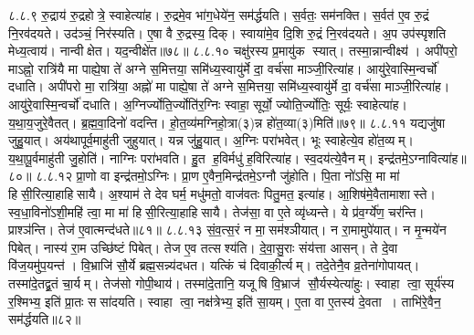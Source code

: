 ८.८.९
रु॒द्राय॑ रु॒द्रहोत्रे॒ स्वाहेत्या॑ह। रु॒द्रमे॒व भा॑ग॒धेये॑न॒ सम॑र्द्धयति। स॒र्वतः॒ सम॑नक्ति। स॒र्वत॑ ए॒व रु॒द्रं नि॒रव॑दयते। उद॑ञ्चं॒ निर॑स्यति। ए॒षा वै रु॒द्रस्य॒ दिक्। स्वाया॑मे॒व दि॒शि रु॒द्रं नि॒रव॑दयते। अ॒प उप॑स्पृशति मेध्य॒त्वाय॑। नान्वीक्षेत। यद॒न्वीक्षे॑त॥७८॥
८.८.१०
चक्षु॑रस्य प्र॒मायु॑क स्यात्। तस्मा॒न्नान्वीक्ष्य॑। अपी॑परो॒ माऽह्नो॒ रात्रि॑यै मा पाह्ये॒षा ते॑ अग्ने स॒मित्तया॒ समि॑ध्य॒स्वायु॑र्मे दा॒ वर्च॑सा माञ्जी॒रित्या॑ह। आयु॑रे॒वास्मि॒न्वर्चो॑ दधाति। अपी॑परो मा॒ रात्रि॑या॒ अह्नो॑ मा पाह्ये॒षा ते॑ अग्ने स॒मित्तया॒ समि॑ध्य॒स्वायु॑र्मे दा॒ वर्च॑सा माञ्जी॒रित्या॑ह। आयु॑रे॒वास्मि॒न्वर्चो॑ दधाति। अ॒ग्निर्ज्योति॒र्ज्योति॑र॒ग्निः स्वाहा॒ सूर्यो॒ ज्योति॒र्ज्योतिः॒ सूर्यः॒ स्वाहेत्या॑ह। य॒था॒य॒जुरे॒वैतत्। ब्र॒ह्म॒वा॒दिनो॑ वदन्ति। हो॒त॒व्य॑मग्निहो॒त्रा(३)न्न हो॑त॒व्या(३)मिति॑॥७९॥
८.८.११
यद्यजु॑षा जुहु॒यात्। अय॑थापूर्व॒माहु॑ती जुहुयात्। यन्न जु॑हु॒यात्। अ॒ग्निः परा॑भवेत्। भूः स्वाहेत्ये॒व हो॑त॒व्यम्। य॒था॒पू॒र्वमाहु॑ती जु॒होति॑। नाग्निः परा॑भवति। हु॒त ह॒विर्मधु॑ ह॒विरित्या॑ह। स्व॒दय॑त्ये॒वैनम्। इन्द्र॑तमे॒ऽग्नावित्या॑ह॥८०॥
८.८.१२
प्रा॒णो वा इन्द्र॑तमो॒ऽग्निः। प्रा॒ण ए॒वैन॒मिन्द्र॑तमे॒ऽग्नौ जु॑होति। पि॒ता नो॑ऽसि॒ मा मा॑ हिसी॒रित्या॒हाहिसायै। अ॒श्याम॑ ते देव घर्म॒ मधु॑मतो॒ वाज॑वतः पितु॒मत॒ इत्या॑ह। आ॒शिष॑मे॒वैतामाशास्ते। स्व॒धा॒विनो॑ऽशी॒महि॑ त्वा॒ मा मा॑ हिसी॒रित्या॒हाहिसायै। तेज॑सा॒ वा ए॒ते व्यृ॑ध्यन्ते। ये प्र॑व॒र्ग्ये॑ण॒ चर॑न्ति। प्राश्ञ॑न्ति। तेज॑ ए॒वात्मन्द॑धते॥८१॥
८.८.१३
सं॒व॒त्स॒रं न मा॒सम॑श्ञीयात्। न रा॒मामुपे॑यात्। न मृ॒न्मये॑न पिबेत्। नास्य॑ रा॒म उच्छि॑ष्टं पिबेत्। तेज ए॒व तत्सश्य॑ति। दे॒वा॒सु॒राः संय॑त्ता आसन्। ते दे॒वा वि॑ज॒यमु॑प॒यन्त॑। वि॒भ्राजि॑ सौ॒र्ये ब्रह्म॒सन्न्य॑दधत। यत्किं च॑ दिवाकी॒र्त्यम्। तदे॒तेनै॒व व्र॒तेना॑गोपायत्। तस्मा॑दे॒तद्व्र॒तं चा॒र्यम्। तेज॑सो गोपी॒थाय॑। तस्मा॑दे॒तानि॒ यजूषि वि॒भ्राज॑ सौ॒र्यस्येत्या॑हुः। स्वाहा त्वा॒ सूर्य॑स्य र॒श्मिभ्य॒ इति॑ प्रा॒तः ससा॑दयति। स्वाहा त्वा॒ नक्ष॑त्रेभ्य॒ इति॑ सा॒यम्। ए॒ता वा ए॒तस्य॑ दे॒वता। ताभि॑रे॒वैन॒ सम॑र्द्धयति॥८२॥
\anuvakamend

